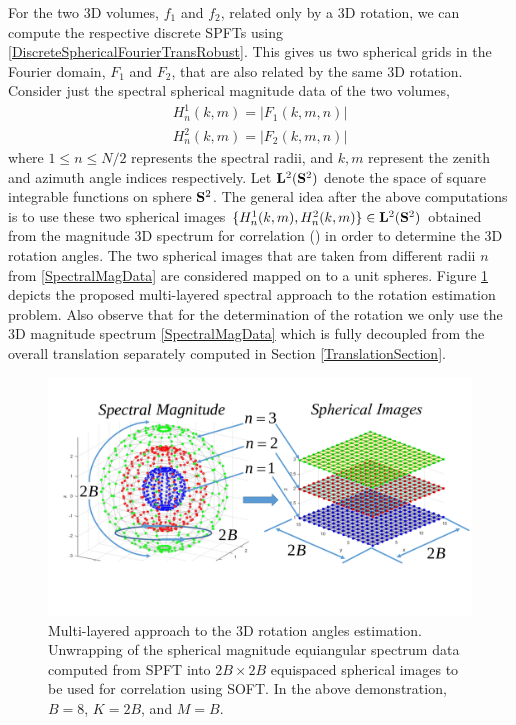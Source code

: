 \documentclass{UCF_ETD}
\begin{document}
For the two $3$D volumes, $f_1$ and $f_2$, related only by a $3$D rotation, we can compute the respective discrete SPFTs using \eqref{DiscreteSphericalFourierTransRobust}. This gives us two spherical grids in the Fourier domain, $F_1$ and $F_2$, that are also related by the same $3$D rotation. Consider just the spectral spherical magnitude data of the two volumes, 
\begin{eqnarray} \label{SpectralMagData}
H^1_n(k,m) = |F_1( k,m,n)|  \nonumber \\
H^2_n(k,m) = |F_2( k,m,n)|
\end{eqnarray}
where $1\leq n \leq N/2$ represents the spectral radii, and $k, m$ represent the zenith and azimuth angle indices respectively. Let ${\bf L}^2({\bf S}^2)$ denote the space of square integrable functions on sphere ${\bf S}^2$. The general idea after the above computations is to use these two spherical images  
$ \{H^1_n(k,m), H^2_n(k,m)\}  \in  {\bf L}^2({\bf S}^2)$ obtained from the magnitude $3$D spectrum for correlation (\cite{Kostelec2008}) in order to determine the $3$D rotation angles. The two spherical images that are taken from different radii $n$ from \eqref{SpectralMagData} are considered mapped on to a unit spheres. Figure \ref{SphericalImages_123.fig} depicts the proposed multi-layered spectral approach to the rotation estimation problem. Also observe that for the determination of the rotation we only use the $3$D magnitude spectrum \eqref{SpectralMagData} which is fully decoupled from the overall translation separately computed in Section \ref{TranslationSection}.

\begin{figure}[H] 
\begin{center}
\includegraphics[scale=0.4]{RobustRegistration/MultilayeredApproach}
\caption{Multi-layered approach to the $3$D rotation angles estimation. Unwrapping of the spherical magnitude equiangular spectrum data computed from SPFT into $2B\times 2B$ equispaced spherical images to be used for correlation using SOFT. In the above demonstration, $B=8$, $K = 2B$, and  $M = B$.}
\label{SphericalImages_123.fig}
\end{center}
\end{figure}
\end{document}
